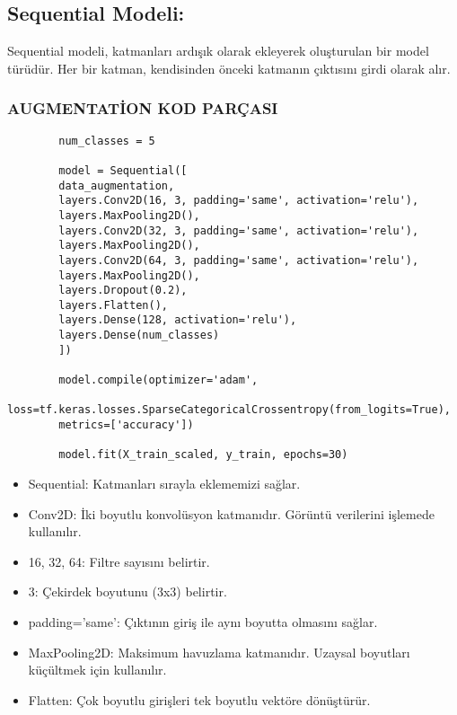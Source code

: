 \documentclass[11pt,a4paper]{report}
\begin{document}
\begin{justify}
 	\section{Sequential Modeli:}
 	Sequential modeli, katmanları ardışık olarak ekleyerek oluşturulan bir model türüdür. Her bir katman, kendisinden önceki katmanın çıktısını girdi olarak alır.
 
 	\subsubsection{AUGMENTATİON KOD PARÇASI}
 	\begin{verbatim}
 		num_classes = 5
 		
 		model = Sequential([
 		data_augmentation,
 		layers.Conv2D(16, 3, padding='same', activation='relu'),
 		layers.MaxPooling2D(),
 		layers.Conv2D(32, 3, padding='same', activation='relu'),
 		layers.MaxPooling2D(),
 		layers.Conv2D(64, 3, padding='same', activation='relu'),
 		layers.MaxPooling2D(),
 		layers.Dropout(0.2),
 		layers.Flatten(),
 		layers.Dense(128, activation='relu'),
 		layers.Dense(num_classes)
 		])
 		
 		model.compile(optimizer='adam',
 		loss=tf.keras.losses.SparseCategoricalCrossentropy(from_logits=True),
 		metrics=['accuracy'])
 		
 		model.fit(X_train_scaled, y_train, epochs=30)
 	\end{verbatim}
 	\clearpage
 \begin{itemize}
 	
 	\subsubsection{AUGMENTATİON KODUNUN TERMİNOLOJİSİ}
 	\item  Sequential: Katmanları sırayla eklememizi sağlar.
 	\item   Conv2D: İki boyutlu konvolüsyon katmanıdır. Görüntü verilerini işlemede kullanılır.
 	\item   16, 32, 64: Filtre sayısını belirtir.
 	\item   3: Çekirdek boyutunu (3x3) belirtir.
 	\item   padding='same': Çıktının giriş ile aynı boyutta olmasını sağlar.
 	
 	\item   MaxPooling2D: Maksimum havuzlama katmanıdır. Uzaysal boyutları küçültmek için kullanılır.
 	
 	\item  Flatten: Çok boyutlu girişleri tek boyutlu vektöre dönüştürür.
 	

\end{itemize}
\end{justify}
\end{document}
